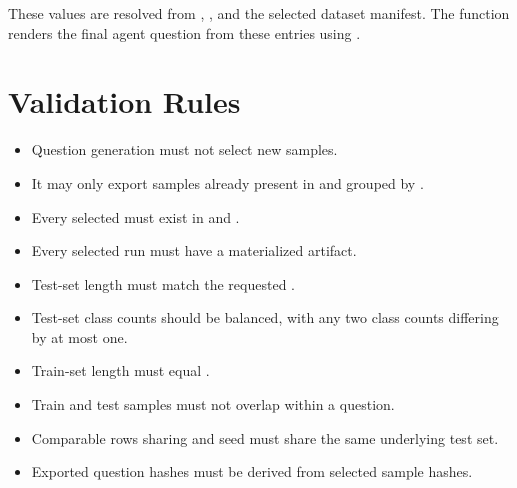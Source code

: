 \documentclass[11pt]{article}
\begin{document}
These values are resolved from , , and the selected dataset manifest.
The function  renders the final agent question from these entries using .


\section*{Validation Rules}

\begin{itemize}
\item Question generation must not select new samples.
\item It may only export samples already present in  and grouped by .
\item Every selected  must exist in  and .
\item Every selected run must have a materialized  artifact.
\item Test-set length must match the requested .
\item Test-set class counts should be balanced, with any two class counts differing by at most one.
\item Train-set length must equal .
\item Train and test samples must not overlap within a question.
\item Comparable rows sharing  and seed must share the same underlying test set.
\item Exported question hashes must be derived from selected sample hashes.
\end{itemize}
\end{document}
